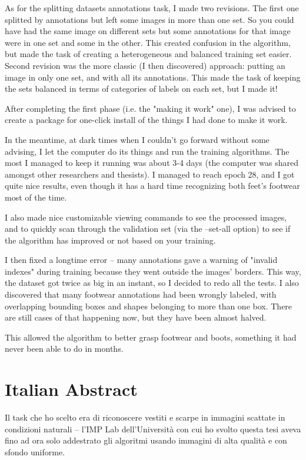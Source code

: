 As for the splitting datasets annotations task, I made two revisions. The first one splitted by annotations but left some images in more than one set. So you could have had the same image on different sets but some annotations for that image were in one set and some in the other. This created confusion in the algorithm, but made the task of creating a heterogeneous and balanced training set easier. Second revision was the more classic (I then discovered) approach: putting an image in only one set, and with all its annotations. This made the task of keeping the sets balanced in terms of categories of labels on each set, but I made it!

After completing the first phase (i.e. the "making it work" one), I was advised to create a package for one-click install of the things I had done to make it work.

In the meantime, at dark times when I couldn't go forward without some advising, I let the computer do its things and run the training algorithms. The most I managed to keep it running was about 3-4 days (the computer was shared amongst other researchers and thesists). I managed to reach epoch 28, and I got quite nice results, even though it has a hard time recognizing both feet's footwear most of the time. 

I also made nice customizable viewing commands to see the processed images, and to quickly scan through the validation set (via the --set-all option) to see if the algorithm has improved or not based on your training.

I then fixed a longtime error -- many annotations gave a warning of "invalid indexes" during training because they went outside the images' borders. This way, the dataset got twice as big in an instant, so I decided to redo all the tests. I also discovered that many footwear annotations had been wrongly labeled, with overlapping bounding boxes and shapes belonging to more than one box. There are still cases of that happening now, but they have been almost halved.

This allowed the algorithm to better grasp footwear and boots, something it had never been able to do in months.
\pagebreak

\section*{Italian Abstract}


Il task che ho scelto era di riconoscere vestiti e scarpe in immagini scattate in condizioni naturali -- l'IMP Lab dell'Università con cui ho svolto questa tesi aveva fino ad ora solo addestrato gli algoritmi usando immagini di alta qualità e con sfondo uniforme.

